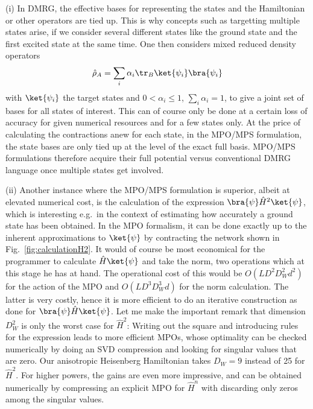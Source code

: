 (i) In DMRG, the effective bases for representing the states and the Hamiltonian or other operators are tied up. This is why concepts such as targetting multiple states arise, if we consider several different states like the ground state and the first excited state at the same time. One then considers mixed reduced density operators
\begin{equation}
\hat{\rho}_A = \sum_{i} \alpha_i \tr_B \ket{\psi_i}\bra{\psi_i}
\end{equation}
with $\ket{\psi_i}$ the target states and $0 < \alpha_i \leq 1$, $\sum_i \alpha_i =1$, to give a joint set of bases for all states of interest. This can of course only be done at a certain loss of accuracy for given numerical resources and for a few states only. At the price of calculating the contractions anew for each state, in the MPO/MPS formulation, the state bases are only tied up at the level of the exact full basis. MPO/MPS formulations therefore acquire their full potential versus conventional DMRG language once multiple states get involved.

(ii) Another instance where the MPO/MPS formulation is superior, albeit at elevated numerical cost, is the calculation of the expression $\bra{\psi} \hat{H}^2 \ket{\psi}$, which is interesting e.g.\ in the context of estimating how accurately a ground state has been obtained. In the MPO formalism, it can be done exactly up to the inherent approximations to $\ket{\psi}$ by contracting the network shown in Fig.~\ref{fig:calculationH2}. It would of course be most economical for the programmer to calculate $\hat{H}\ket{\psi}$ and take the norm, two operations which at this stage he has at hand. The operational cost of this would be $O(LD^2D_W^2 d^2)$ for the action of the MPO and $O(LD^3 D_W^3 d)$ for the norm calculation. The latter is very costly, hence it is more efficient to do an iterative construction as done for $\bra{\psi} \hat{H} \ket{\psi}$. Let me make the important remark that dimension $D_W^2$ is only the worst case for $\hat{H}^2$\cite{Frowis10}: Writing out the square and introducing rules for the expression leads to more efficient MPOs, whose optimality can be checked numerically by doing an SVD compression and looking for singular values that are zero. Our anisotropic Heisenberg Hamiltonian takes $D_W=9$ instead of 25 for $\hat{H}^2 $. For higher powers, the gains are even more impressive, and can be obtained numerically by compressing an explicit MPO for $\hat{H}^n$ with discarding only zeros among the singular values. 

